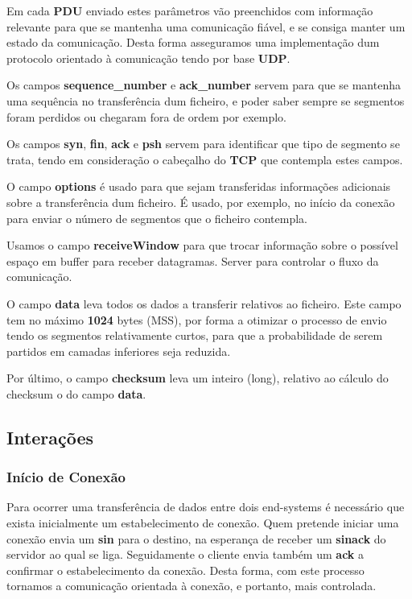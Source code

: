 \documentclass{llncs}
\begin{document}
Em cada \textbf{PDU} enviado estes parâmetros vão preenchidos com informação relevante para que se mantenha uma comunicação fiável, e se consiga manter um estado da comunicação. Desta forma asseguramos uma implementação dum protocolo orientado à comunicação tendo por base \textbf{UDP}.

Os campos \textbf{sequence\_number} e \textbf{ack\_number} servem para que se mantenha uma sequência no transferência dum ficheiro, e poder saber sempre se segmentos foram perdidos ou chegaram fora de ordem por exemplo.

Os campos \textbf{syn}, \textbf{fin}, \textbf{ack} e \textbf{psh} servem para identificar que tipo de segmento se trata, tendo em consideração o cabeçalho do \textbf{TCP} que contempla estes campos.

O campo \textbf{options} é usado para que sejam transferidas informações adicionais sobre a transferência dum ficheiro. É usado, por exemplo, no início da conexão para enviar o número de segmentos que o ficheiro contempla.

Usamos o campo \textbf{receiveWindow} para que trocar informação sobre o possível espaço em buffer para receber datagramas. Server para controlar o fluxo da comunicação.

O campo \textbf{data} leva todos os dados a transferir relativos ao ficheiro. Este campo tem no máximo \textbf{1024} bytes (MSS), por forma a otimizar o processo de envio tendo os segmentos relativamente curtos, para que a probabilidade de serem partidos em camadas inferiores seja reduzida.

Por último, o campo \textbf{checksum} leva um inteiro (long), relativo ao cálculo do checksum o do campo \textbf{data}.


\subsection{Interações}

\subsubsection{Início de Conexão}

Para ocorrer uma transferência de dados entre dois end-systems é necessário que exista inicialmente um estabelecimento de conexão. Quem pretende iniciar uma conexão envia um \textbf{sin} para o destino, na esperança de receber um \textbf{sinack} do servidor ao qual se liga. Seguidamente o cliente envia também um \textbf{ack} a confirmar o estabelecimento da conexão. Desta forma, com este processo tornamos a comunicação orientada à conexão, e portanto, mais controlada.
\end{document}

